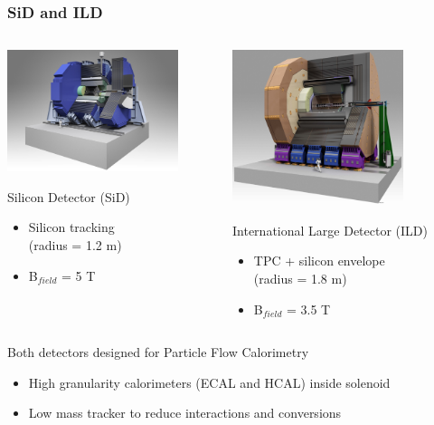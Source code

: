 \documentclass{beamer}
\begin{document}

\begin{frame}
  \frametitle{SiD and ILD}

  \begin{columns}[t]
    \begin{column}{5cm}
      \includegraphics[width = 5cm, height = 2.9 cm]{Pictures/ILC_SiD.jpg}
      \vspace{-0.25cm}
      \begin{block}{Silicon Detector (SiD)}
        \footnotesize{
        \begin{itemize}
          \item Silicon tracking \\ (radius = 1.2 m)
          \item B$_{field}$ = 5 T
        \end{itemize}
        }
      \end{block}
    \end{column}

    \begin{column}{5cm}
      \includegraphics[width = 5cm, height = 2.9 cm]{Pictures/ILD_all_110826.jpg}
      \vspace{-0.25cm}
      \begin{block}{International Large Detector (ILD)}
        \footnotesize{
        \begin{itemize}
          \item TPC + silicon envelope \\ (radius = 1.8 m)
          \item B$_{field}$ = 3.5 T
        \end{itemize}
        }
      \end{block}
    \end{column}
  \end{columns}

  \begin{block}{Both detectors designed for Particle Flow Calorimetry}
    \footnotesize{
    \begin{itemize}
      \item High granularity calorimeters (ECAL and HCAL) inside solenoid
      \item Low mass tracker to reduce interactions and conversions
    \end{itemize}
    }
  \end{block}
  
\end{frame}
\end{document}
